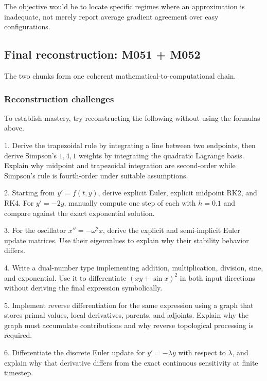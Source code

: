 The objective would be to locate specific regimes where an approximation is inadequate, not merely report average gradient agreement over easy configurations.

\subsection{Final reconstruction: M051 + M052}\label{02-foundations-ii-ch022-final-reconstruction-m051-m052}

The two chunks form one coherent mathematical-to-computational chain.

\subsubsection{Reconstruction challenges}\label{02-foundations-ii-ch022-reconstruction-challenges}

To establish mastery, try reconstructing the following without using the formulas above.

1. Derive the trapezoidal rule by integrating a line between two endpoints, then derive Simpson's \(1,4,1\) weights by integrating the quadratic Lagrange basis. Explain why midpoint and trapezoidal integration are second-order while Simpson's rule is fourth-order under suitable assumptions.

2. Starting from \(y'=f(t,y)\), derive explicit Euler, explicit midpoint RK2, and RK4. For \(y'=-2y\), manually compute one step of each with \(h=0.1\) and compare against the exact exponential solution.

3. For the oscillator \(x''=-\omega^2x\), derive the explicit and semi-implicit Euler update matrices. Use their eigenvalues to explain why their stability behavior differs.

4. Write a dual-number type implementing addition, multiplication, division, sine, and exponential. Use it to differentiate \((xy+\sin x)^2\) in both input directions without deriving the final expression symbolically.

5. Implement reverse differentiation for the same expression using a graph that stores primal values, local derivatives, parents, and adjoints. Explain why the graph must accumulate contributions and why reverse topological processing is required.

6. Differentiate the discrete Euler update for \(y'=-\lambda y\) with respect to \(\lambda\), and explain why that derivative differs from the exact continuous sensitivity at finite timestep.

